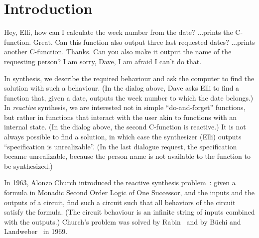 \chapter{Introduction}

{\small
\noindent
\li
\-[Dave:~] Hey, Elli, how can I calculate the week number from the date?
\vspace{-3mm}
\-[Elli:~] ...prints the C-function.
\vspace{-3mm}
\-[Dave:~] Great. Can this function also output three last requested dates?
\vspace{-3mm}
\-[Elli:~] ...prints another C-function.
\vspace{-3mm}
\-[Dave:~] Thanks. Can you also make it output the name of the requesting person?
\vspace{-3mm}
\-[Elli:~] I am sorry, Dave, I am afraid I can't do that.
\il
}

In synthesis,
we describe the required behaviour and ask the computer to find the solution
with such a behaviour.
(In the dialog above,
 Dave asks Elli to find a function that,
 given a date, outputs the week number to which the date belongs.)
In \emph{reactive} synthesis, we are interested not in simple ``do-and-forget'' functions,
but rather in functions that interact with the user
akin to functions with an internal state.
(In the dialog above, the second C-function is reactive.)
It is not always possible to find a solution,
in which case the synthesizer (Elli) outputs ``specification is unrealizable''.
(In the last dialogue request, the specification became unrealizable,
 because the person name is not available to the function to be synthesized.)


In 1963, Alonzo Church introduced the reactive synthesis problem~\cite{Church63}:
given a formula in Monadic Second Order Logic of One Successor,
and the inputs and the outputs of a circuit,
find such a circuit such that all behaviors of the circuit satisfy the formula.
(The circuit behaviour is an infinite string of inputs combined with the outputs.)
Church's problem was solved by Rabin~\cite{Rabin69} and
by B\"uchi and Landweber~\cite{BL69} in 1969.


